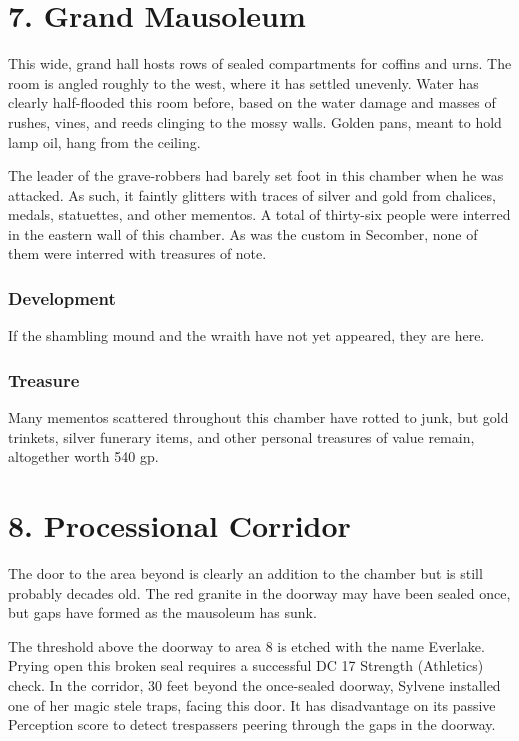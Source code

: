 \documentclass[10pt,a4paper,twoside,twocolumn,openany,bg=print,nodeprecatedcode]{dndbook}
\begin{document}
\section{7. Grand Mausoleum}
\begin{DndReadAloud}{}
This wide, grand hall hosts rows of sealed compartments for coffins and urns. The room is angled roughly to the west, where it has settled unevenly. Water has clearly half-flooded this room before, based on the water damage and masses of rushes, vines, and reeds clinging to the mossy walls. Golden pans, meant to hold lamp oil, hang from the ceiling.
\end{DndReadAloud}

The leader of the grave-robbers had barely set foot in this chamber when he was attacked. As such, it faintly glitters with traces of silver and gold from chalices, medals, statuettes, and other mementos.
A total of thirty-six people were interred in the eastern wall of this chamber. As was the custom in Secomber, none of them were interred with treasures of note.
\subsubsection{Development}
If the shambling mound and the wraith have not yet appeared, they are here.
\subsubsection{Treasure}
Many mementos scattered throughout this chamber have rotted to junk, but gold trinkets, silver funerary items, and other personal treasures of value remain, altogether worth 540 gp.
\section{8. Processional Corridor}
\begin{DndReadAloud}{}
The door to the area beyond is clearly an addition to the chamber but is still probably decades old. The red granite in the doorway may have been sealed once, but gaps have formed as the mausoleum has sunk.
\end{DndReadAloud}

The threshold above the doorway to area 8 is etched with the name Everlake. Prying open this broken seal requires a successful DC 17 Strength (Athletics) check.
In the corridor, 30 feet beyond the once-sealed doorway, Sylvene installed one of her magic stele traps, facing this door. It has disadvantage on its passive Perception score to detect trespassers peering through the gaps in the doorway.
\end{document}
